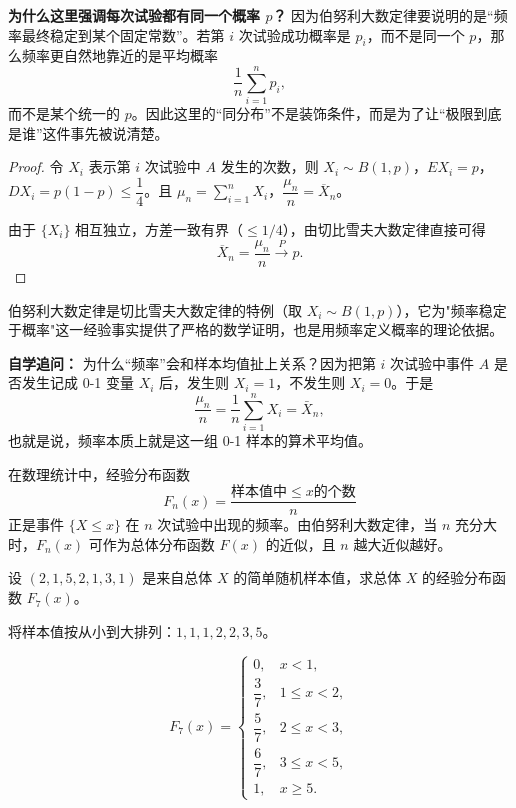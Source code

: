 ﻿\documentclass[lang=cn,11pt]{elegantbook}
\begin{document}
\begin{note}
\textbf{为什么这里强调每次试验都有同一个概率 \(p\)？} 因为伯努利大数定律要说明的是“频率最终稳定到某个固定常数”。若第 \(i\) 次试验成功概率是 \(p_i\)，而不是同一个 \(p\)，那么频率更自然地靠近的是平均概率
\[
\frac1n\sum_{i=1}^n p_i,
\]
而不是某个统一的 \(p\)。因此这里的“同分布”不是装饰条件，而是为了让“极限到底是谁”这件事先被说清楚。
\end{note}
\begin{proof}
令 \(X_i\) 表示第 \(i\) 次试验中 \(A\) 发生的次数，则 \(X_i \sim B(1,p)\)，\(EX_i = p\)，\(DX_i = p(1-p) \leq \dfrac{1}{4}\)。且 \(\mu_n = \sum_{i=1}^{n} X_i\)，\(\dfrac{\mu_n}{n} = \overline{X}_n\)。

由于 \(\{X_i\}\) 相互独立，方差一致有界（\(\leq 1/4\)），由切比雪夫大数定律直接可得
\[
\overline{X}_n = \frac{\mu_n}{n} \xrightarrow{P} p.
\]
\end{proof}

\begin{note}
伯努利大数定律是切比雪夫大数定律的特例（取 \(X_i \sim B(1,p)\)），它为"频率稳定于概率"这一经验事实提供了严格的数学证明，也是用频率定义概率的理论依据。

\textbf{自学追问：} 为什么“频率”会和样本均值扯上关系？因为把第 \(i\) 次试验中事件 \(A\) 是否发生记成 0-1 变量 \(X_i\) 后，发生则 \(X_i=1\)，不发生则 \(X_i=0\)。于是
\[
\frac{\mu_n}{n}=\frac{1}{n}\sum_{i=1}^{n}X_i=\bar X_n,
\]
也就是说，频率本质上就是这一组 0-1 样本的算术平均值。

在数理统计中，经验分布函数
\[
F_n(x) = \frac{\text{样本值中} \leq x \text{的个数}}{n}
\]
正是事件 \(\{X \leq x\}\) 在 \(n\) 次试验中出现的频率。由伯努利大数定律，当 \(n\) 充分大时，\(F_n(x)\) 可作为总体分布函数 \(F(x)\) 的近似，且 \(n\) 越大近似越好。
\end{note}

\begin{exercise}\label{exer:5-empirical}
设 \((2, 1, 5, 2, 1, 3, 1)\) 是来自总体 \(X\) 的简单随机样本值，求总体 \(X\) 的经验分布函数 \(F_7(x)\)。
\end{exercise}

\begin{solution}
将样本值按从小到大排列：\(1, 1, 1, 2, 2, 3, 5\)。

\[
F_7(x) = \begin{cases}
0, & x < 1, \\
\dfrac{3}{7}, & 1 \leq x < 2, \\[6pt]
\dfrac{5}{7}, & 2 \leq x < 3, \\[6pt]
\dfrac{6}{7}, & 3 \leq x < 5, \\[6pt]
1, & x \geq 5.
\end{cases}
\]
\end{solution}
\end{document}

